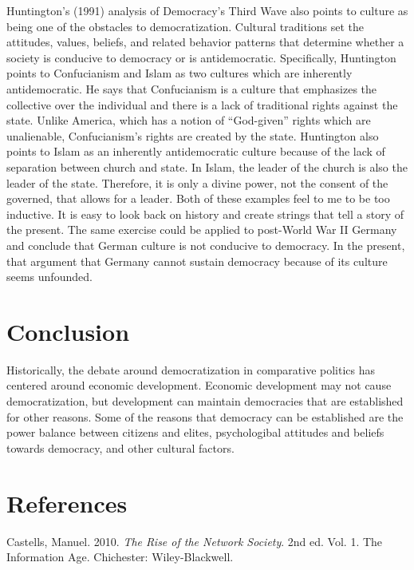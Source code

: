 \documentclass[12pt,]{article}
\begin{document}
Huntington's (1991) analysis of Democracy's Third Wave also points to
culture as being one of the obstacles to democratization. Cultural
traditions set the attitudes, values, beliefs, and related behavior
patterns that determine whether a society is conducive to democracy or
is antidemocratic. Specifically, Huntington points to Confucianism and
Islam as two cultures which are inherently antidemocratic. He says that
Confucianism is a culture that emphasizes the collective over the
individual and there is a lack of traditional rights against the state.
Unlike America, which has a notion of ``God-given'' rights which are
unalienable, Confucianism's rights are created by the state. Huntington
also points to Islam as an inherently antidemocratic culture because of
the lack of separation between church and state. In Islam, the leader of
the church is also the leader of the state. Therefore, it is only a
divine power, not the consent of the governed, that allows for a leader.
Both of these examples feel to me to be too inductive. It is easy to
look back on history and create strings that tell a story of the
present. The same exercise could be applied to post-World War II Germany
and conclude that German culture is not conducive to democracy. In the
present, that argument that Germany cannot sustain democracy because of
its culture seems unfounded.

\hypertarget{conclusion}{%
\section{Conclusion}\label{conclusion}}

Historically, the debate around democratization in comparative politics
has centered around economic development. Economic development may not
cause democratization, but development can maintain democracies that are
established for other reasons. Some of the reasons that democracy can be
established are the power balance between citizens and elites,
psychologibal attitudes and beliefs towards democracy, and other
cultural factors.

\hypertarget{references}{%
\section*{References}\label{references}}

\hypertarget{refs}{}
\leavevmode\hypertarget{ref-castells}{}%
Castells, Manuel. 2010. \emph{The Rise of the Network Society}. 2nd ed.
Vol. 1. The Information Age. Chichester: Wiley-Blackwell.
\end{document}

